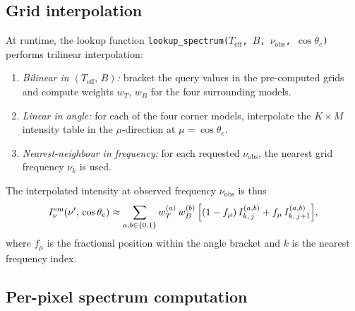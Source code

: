 \subsection{Grid interpolation}

At runtime, the lookup function
\texttt{lookup\_spectrum($T_{\mathrm{eff}}$, $B$, $\nu_{\mathrm{obs}}$,
$\cos\theta_e$)} performs trilinear interpolation:
\begin{enumerate}
  \item \emph{Bilinear in $(T_{\mathrm{eff}},\,B)$:} bracket the query
    values in the pre-computed grids and compute weights
    $w_{T}$, $w_{B}$ for the four surrounding models.
  \item \emph{Linear in angle:} for each of the four corner models,
    interpolate the $K \times M$ intensity table in the $\mu$-direction at
    $\mu = \cos\theta_e$.
  \item \emph{Nearest-neighbour in frequency:} for each requested
    $\nu_{\mathrm{obs}}$, the nearest grid frequency $\nu_k$ is used.
\end{enumerate}
The interpolated intensity at observed frequency $\nu_{\mathrm{obs}}$ is
thus
\begin{equation}
  I_{\nu}^{\mathrm{em}}(\nu',\,\cos\theta_e)
    \approx \sum_{a,b \in \{0,1\}} w_{T}^{(a)}\, w_{B}^{(b)}\,
    \Bigl[(1 - f_\mu)\, I_{k,\,j}^{(a,b)}
    + f_\mu\, I_{k,\,j+1}^{(a,b)}\Bigr],
  \label{eq:trilinear}
\end{equation}
where $f_\mu$ is the fractional position within the angle bracket and
$k$ is the nearest frequency index.

\subsection{Per-pixel spectrum computation}

